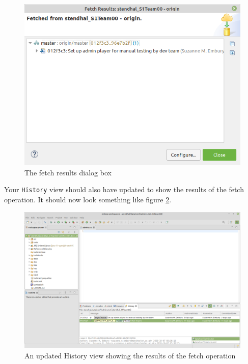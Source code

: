 \documentclass[
]{book}
\begin{document}
\begin{figure}

{\centering \includegraphics[width=1\linewidth]{images/fetchSucceededNoHistory} 

}

\caption{The fetch results dialog box}\label{fig:fetchSucceededNoHistory-fig}
\end{figure}

Your \texttt{History} view should also have updated to show the results of the fetch operation. It should now look something like figure \ref{fig:teamMatesLocalCommitGraphAfterFetchNoHistory-fig}.

\begin{figure}

{\centering \includegraphics[width=1\linewidth]{images/teamMatesLocalCommitGraphAfterFetchNoHistory} 

}

\caption{An updated History view showing the results of the fetch operation}\label{fig:teamMatesLocalCommitGraphAfterFetchNoHistory-fig}
\end{figure}
\end{document}
